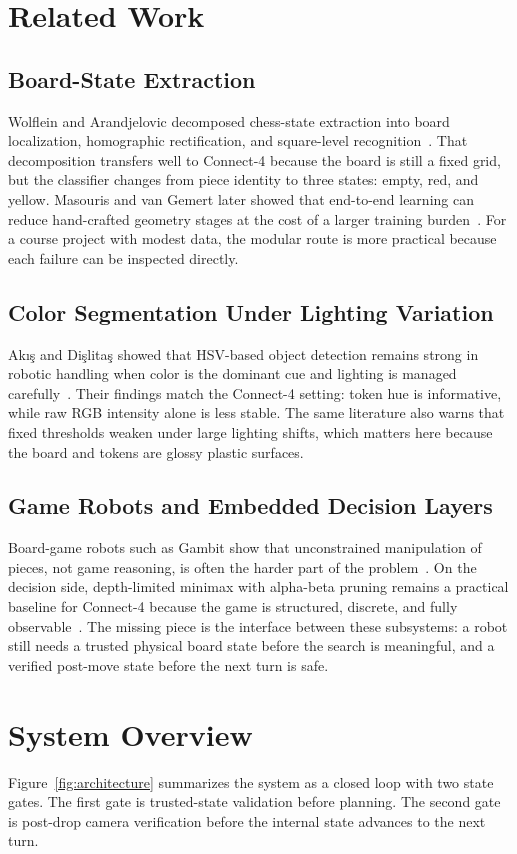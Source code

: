 \documentclass[conference]{IEEEtran}
\begin{document}
\section{Related Work}
\subsection{Board-State Extraction}
Wolflein and Arandjelovic decomposed chess-state extraction into board localization, homographic rectification, and square-level recognition~\cite{Wolflein2021}. That decomposition transfers well to Connect-4 because the board is still a fixed grid, but the classifier changes from piece identity to three states: empty, red, and yellow. Masouris and van Gemert later showed that end-to-end learning can reduce hand-crafted geometry stages at the cost of a larger training burden~\cite{Masouris2023}. For a course project with modest data, the modular route is more practical because each failure can be inspected directly.

\subsection{Color Segmentation Under Lighting Variation}
Ak\i{}\c{s} and Di\c{s}lita\c{s} showed that HSV-based object detection remains strong in robotic handling when color is the dominant cue and lighting is managed carefully~\cite{Akis2024}. Their findings match the Connect-4 setting: token hue is informative, while raw RGB intensity alone is less stable. The same literature also warns that fixed thresholds weaken under large lighting shifts, which matters here because the board and tokens are glossy plastic surfaces.

\subsection{Game Robots and Embedded Decision Layers}
Board-game robots such as Gambit show that unconstrained manipulation of pieces, not game reasoning, is often the harder part of the problem~\cite{Matuszek2011}. On the decision side, depth-limited minimax with alpha-beta pruning remains a practical baseline for Connect-4 because the game is structured, discrete, and fully observable~\cite{Russell2020}. The missing piece is the interface between these subsystems: a robot still needs a trusted physical board state before the search is meaningful, and a verified post-move state before the next turn is safe.

\section{System Overview}
Figure~\ref{fig:architecture} summarizes the system as a closed loop with two state gates. The first gate is trusted-state validation before planning. The second gate is post-drop camera verification before the internal state advances to the next turn.
\end{document}
